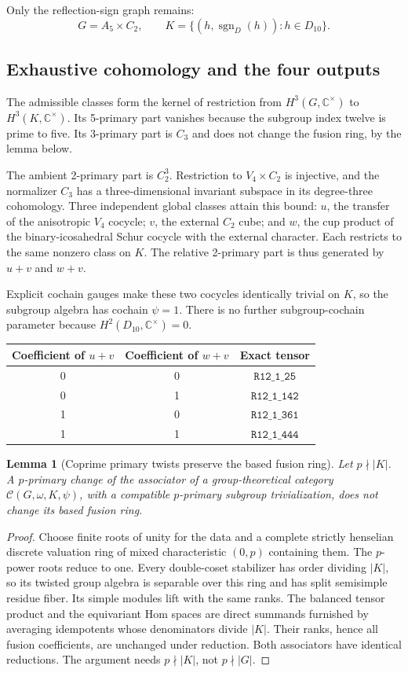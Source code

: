 \documentclass[11pt]{article}
\newtheorem{lemma}[theorem]{Lemma}
\newcommand{\R}[1]{\texttt{R12\_1\_#1}}
\newcommand{\C}{\mathbb C}
\begin{document}
Only the reflection-sign graph remains:
\[
G=A_5\times C_2,\qquad
K=\{(h,\operatorname{sgn}_{D}(h)):h\in D_{10}\}.
\]

\subsection{Exhaustive cohomology and the four outputs}
The admissible classes form the kernel of restriction from
$H^3(G,\C^\times)$ to $H^3(K,\C^\times)$.
Its 5-primary part vanishes because the subgroup index twelve is prime
to five. Its 3-primary part is $C_3$ and does not change the fusion ring,
by the lemma below.

The ambient 2-primary part is $C_2^3$. Restriction to
$V_4\times C_2$ is injective, and the normalizer $C_3$ has a
three-dimensional invariant subspace in its degree-three cohomology.
Three independent global classes attain this bound: $u$, the transfer
of the anisotropic $V_4$ cocycle; $v$, the external $C_2$ cube; and $w$,
the cup product of the binary-icosahedral Schur cocycle with the external
character. Each restricts to the same nonzero class on $K$. The relative
2-primary part is thus generated by $u+v$ and $w+v$.

Explicit cochain gauges make these two cocycles identically trivial on
$K$, so the subgroup algebra has cochain $\psi=1$. There is no further
subgroup-cochain parameter because $H^2(D_{10},\C^\times)=0$.

\begin{center}
\begin{tabular}{ccc}
\toprule
Coefficient of $u+v$ & Coefficient of $w+v$ & Exact tensor\\
\midrule
0&0&$\R{25}$\\
0&1&$\R{142}$\\
1&0&$\R{361}$\\
1&1&$\R{444}$\\
\bottomrule
\end{tabular}
\end{center}

\begin{lemma}[Coprime primary twists preserve the based fusion ring]
Let $p\nmid |K|$. A $p$-primary change of the associator of a
group-theoretical category $\mathcal C(G,\omega,K,\psi)$, with a compatible
$p$-primary subgroup trivialization, does not change its based fusion ring.
\end{lemma}
\begin{proof}
Choose finite roots of unity for the data and a complete strictly henselian
discrete valuation ring of mixed characteristic $(0,p)$ containing them.
The $p$-power roots reduce to one. Every double-coset stabilizer has order
dividing $|K|$, so its twisted group algebra is separable over this ring
and has split semisimple residue fiber. Its simple modules lift with the
same ranks. The balanced tensor product and the equivariant Hom spaces
are direct summands furnished by averaging idempotents whose denominators
divide $|K|$. Their ranks, hence all fusion coefficients, are unchanged
under reduction. Both associators have identical reductions.
The argument needs $p\nmid |K|$, not $p\nmid |G|$.
\end{proof}
\end{document}
